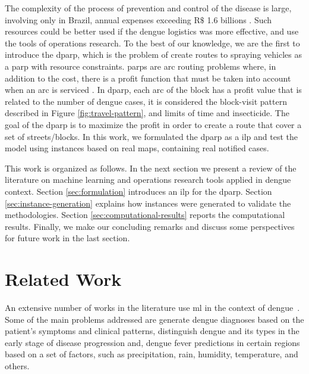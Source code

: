 \documentclass[a4paper,11pt]{article}
\begin{document}
The complexity of the process of prevention and control of the disease is large,
involving  only  in  Brazil,  annual   expenses  exceeding  R$\$$  1.6  billions
\citep{negreiros-2020}.  Such  resources could  be  better  used if  the  dengue
logistics was more  effective, and use the tools of  operations research. To the
best of our knowledge,  we are the first to introduce  the \gls{dparp}, which is
the problem of create routes to  spraying vehicles as a \gls{parp} with resource
constraints.  \gls{parp}s are  arc routing  problems where,  in addition  to the
cost, there is a profit function that must  be taken into account when an arc is
serviced \citep{araoz:2006}. In \gls{dparp}, each arc  of the block has a profit
value  that is  related to  the number  of dengue  cases, it  is considered  the
block-visit pattern described in  Figure \ref{fig:travel-pattern}, and limits of
time and insecticide. The  goal of the \gls{dparp} is to  maximize the profit in
order to  create a route that  cover a set  of streets/blocks. In this  work, we
formulated the  \gls{dparp} as a  \gls{ilp} and  test the model  using instances
based on real maps, containing real notified cases.

This work is  organized as follows. In  the next section we present  a review of
the  literature on  machine learning  and operations  research tools  applied in
dengue context.  Section \ref{sec:formulation}  introduces an \gls{ilp}  for the
\gls{dparp}. Section  \ref{sec:instance-generation} explains how  instances were
generated to validate the methodologies. Section \ref{sec:computational-results}
reports the computational  results. Finally, we make our  concluding remarks and
discuss some perspectives for future work in the last section.

\section{Related Work} \label{sec:related-work}

An extensive number  of works in the  literature use \gls{ml} in  the context of
dengue~\citep{shakurat:2015,shakil:2015,hair:2019,sarma:2020,appice:2020}. Some
of  the main  problems  addressed are  generate dengue  diagnoses  based on  the
patient's symptoms  and clinical patterns,  distinguish dengue and its  types in
the early stage of disease progression  and, dengue fever predictions in certain
regions  based on  a  set of  factors, such  as  precipitation, rain,  humidity,
temperature, and others.
\end{document}
